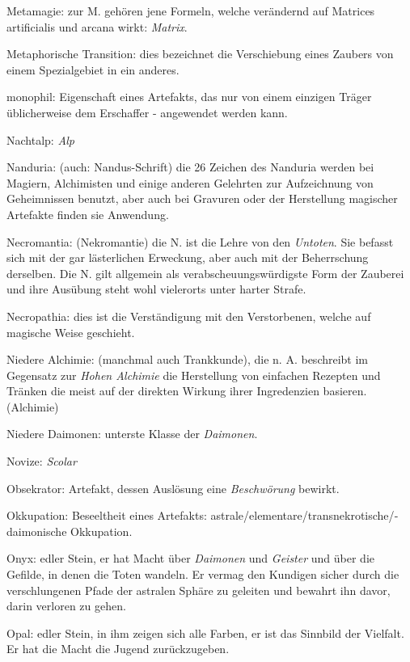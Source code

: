 \documentclass[a5paper,8pt]{book}
\begin{document}
\begin{small}
\begin{description}
 \item Metamagie: zur M. gehören jene Formeln, welche ver­ändernd auf Matrices artificialis und arcana wirkt: \textit{Matrix}.
 \item Metaphorische Transition: dies bezeichnet die Ver­schiebung eines Zaubers von einem Spezialgebiet in ein anderes.
 \item monophil: Eigenschaft eines Artefakts, das nur von einem einzigen Träger üblicherweise dem Erschaffer - angewendet werden kann.
 \item Nachtalp: \textit{Alp}
 \item Nanduria: (auch: Nandus-Schrift) die 26 Zeichen des Nanduria werden bei Magiern, Alchimisten und einige anderen Gelehrten zur Aufzeichnung von Geheimnissen benutzt, aber auch bei Gravuren oder der Herstellung magischer \textit{}Artefakte finden sie Anwendung.
 \item Necromantia: (Nekromantie) die N. ist die Lehre von den \textit{Untoten}. Sie befasst sich mit der gar ­lästerlichen Erweckung, aber auch mit der Beherrschung derselben. Die N. gilt allgemein als ver­abscheuungs­würdigste Form der Zauberei und ihre Aus­übung steht wohl vielerorts unter harter Strafe.
 \item Necropathia: dies ist die Ver­ständigung mit den Verstorbenen, welche auf magische Weise geschieht.
 \item Niedere Alchimie: (manchmal auch Trankkunde), die n. A. beschreibt im Gegensatz zur \textit{Hohen Alchimie} die Herstellung von einfachen Rezepten und Tränken die meist auf der direkten Wirkung ihrer Ingredenzien basieren. (\textit{}Alchimie)
 \item Niedere Daimonen: unterste Klasse der \textit{Daimonen}. 
 \item Novize: \textit{Scolar}
 \item Obsekrator: Artefakt, dessen Auslösung eine \textit{Beschwörung} bewirkt.
 \item Okkupation: Beseeltheit eines Artefakts: astrale/­elementare/­­transnekrotische/­daimonische Okkupation.
 \item Onyx: edler Stein, er hat Macht über \textit{Daimonen} und \textit{Geister} und über die Gefilde, in denen die Toten wandeln. Er vermag den Kundigen sicher durch die verschlungenen Pfade der astralen Sphäre zu geleiten und bewahrt ihn davor, darin verloren zu gehen.
 \item Opal: edler Stein, in ihm zeigen sich alle Farben, er ist das Sinnbild der Vielfalt. Er hat die Macht die Jugend zurückzugeben.

\end{description}
\end{small}
\end{document}
